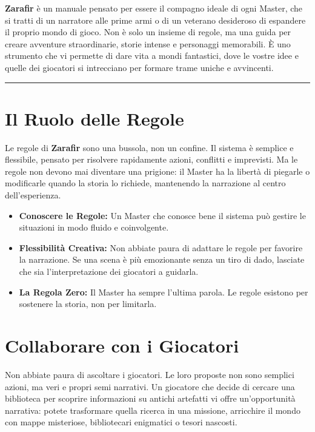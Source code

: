 \documentclass[../manuale_main.tex]{subfiles}
\begin{document}
\textbf{Zarafir} è un manuale pensato per essere il compagno ideale di ogni Master, che si tratti di un narratore alle prime armi o di un veterano desideroso di espandere il proprio mondo di gioco. Non è solo un insieme di regole, ma una guida per creare avventure straordinarie, storie intense e personaggi memorabili. È uno strumento che vi permette di dare vita a mondi fantastici, dove le vostre idee e quelle dei giocatori si intrecciano per formare trame uniche e avvincenti.

\vspace{0.5cm}
\noindent
\begin{center}
\rule{\textwidth}{0.4pt} 
\end{center}
\vspace{0.5cm}

\section{Il Ruolo delle Regole}
Le regole di \textbf{Zarafir} sono una bussola, non un confine. Il sistema è semplice e flessibile, pensato per risolvere rapidamente azioni, conflitti e imprevisti. Ma le regole non devono mai diventare una prigione: il Master ha la libertà di piegarle o modificarle quando la storia lo richiede, mantenendo la narrazione al centro dell’esperienza.

\begin{itemize}
    \item \textbf{Conoscere le Regole:} Un Master che conosce bene il sistema può gestire le situazioni in modo fluido e coinvolgente.
    
    \item \textbf{Flessibilità Creativa:} Non abbiate paura di adattare le regole per favorire la narrazione. Se una scena è più emozionante senza un tiro di dado, lasciate che sia l'interpretazione dei giocatori a guidarla.
    
    \item \textbf{La Regola Zero:} Il Master ha sempre l'ultima parola. Le regole esistono per sostenere la storia, non per limitarla.
\end{itemize}

\vspace{0.3cm}

\section{Collaborare con i Giocatori}
Non abbiate paura di ascoltare i giocatori. Le loro proposte non sono semplici azioni, ma veri e propri semi narrativi. Un giocatore che decide di cercare una biblioteca per scoprire informazioni su antichi artefatti vi offre un'opportunità narrativa: potete trasformare quella ricerca in una missione, arricchire il mondo con mappe misteriose, bibliotecari enigmatici o tesori nascosti.
\end{document}
